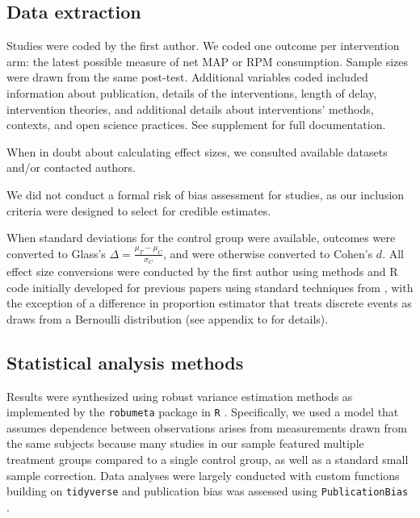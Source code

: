 \documentclass[sn-nature,referee,pdflatex]{sn-jnl}
\begin{document}
\subsection{Data extraction}\label{sec3.3}

Studies were coded by the first author. We coded one outcome per
intervention arm: the latest possible measure of net MAP or RPM
consumption. Sample sizes were drawn from the same post-test. Additional
variables coded included information about publication, details of the
interventions, length of delay, intervention theories, and additional
details about interventions' methods, contexts, and open science
practices. See supplement for full documentation.

When in doubt about calculating effect sizes, we consulted available
datasets and/or contacted authors.

We did not conduct a formal risk of bias assessment for studies, as our
inclusion criteria were designed to select for credible estimates.

When standard deviations for the control group were available, outcomes
were converted to Glass's \(\Delta = \frac{\mu_T - \mu_C}{\sigma_C}\),
and were otherwise converted to Cohen's \(d\). All effect size
conversions were conducted by the first author using methods and R code
initially developed for previous papers
\citep{paluck2019, paluck2021, porat2024} using standard techniques from
\citep{cooper2019}, with the exception of a difference in proportion
estimator that treats discrete events as draws from a Bernoulli
distribution (see appendix to \citep{paluck2021} for details).

\subsection{Statistical analysis methods}\label{sec3.4}

Results were synthesized using robust variance estimation methods
\citep{hedges2010} as implemented by the \texttt{robumeta} package
\citep{fisher2015} in \texttt{R} \citep{Rlang}. Specifically, we used a
model that assumes dependence between observations arises from
measurements drawn from the same subjects because many studies in our
sample featured multiple treatment groups compared to a single control
group, as well as a standard small sample correction. Data analyses were
largely conducted with custom functions building on \texttt{tidyverse}
\citep{wickham2019} and publication bias was assessed using
\texttt{PublicationBias} \citep{mathur2024, mathur2020}.
\end{document}
